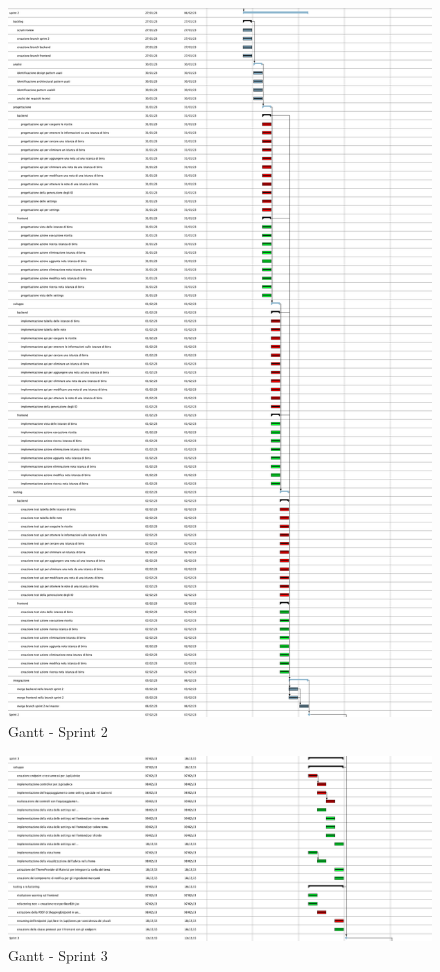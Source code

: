 \documentclass[a4paper,12pt]{report}
\begin{document}
	\begin{figure}[!h]
		\centering
		\includegraphics[width=0.9\linewidth]{image/scrum2.png}
		\caption{Gantt - Sprint 2}\label{fig:scrum2}
	\end{figure}
	
	\begin{figure}[!h]
		\centering
		\includegraphics[width=0.9\linewidth]{image/scrum3.png}
		\caption{Gantt - Sprint 3}\label{fig:scrum3}
	\end{figure}
	
\end{document}

